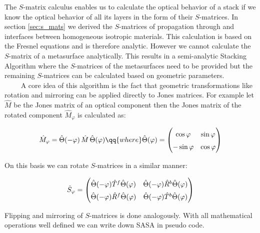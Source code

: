 The $S$-matrix calculus enables us to calculate the optical behavior of a stack if we know the optical behavior of all its layers in the form of their $S$-matrices. In section \ref{sec:s_mats} we derived the $S$-matrices of propagation through and interfaces between homogeneous isotropic materials. This calculation is based on the Fresnel equations and is therefore analytic. However we cannot calculate the $S$-matrix of a metasurface analytically. This results in a semi-analytic Stacking Algorithm where the $S$-matrices of the metasurfaces need to be provided but the remaining $S$-matrices can be calculated based on geometric parameters.
\\


$\qquad$ A core idea of this algorithm is the fact that geometric transformations like rotation and mirroring can be applied directly to Jones matrices. For example let $\hat M$ be the Jones matrix of an optical component then the Jones matrix of the rotated component $\hat{M}_{\varphi}$ is calculated as:

\begin{equation}
    \hat{M}_{\varphi} = \hat \Theta(-\varphi) \, \hat{M} \, \hat \Theta(\varphi)
    \qq{where}
    \hat \Theta(\varphi) =
    \begin{pmatrix}
        \cos \varphi & \sin \varphi \\
        -\sin \varphi & \cos \varphi
    \end{pmatrix}
\end{equation}

On this basis we can rotate $S$-matrices in a similar manner:

\begin{equation}
    \hat S_\varphi =
    \begingroup
    \renewcommand*{\arraystretch}{1.5}
        \begin{pmatrix}
            \hat \Theta(-\varphi) \hat T^f \hat \Theta(\varphi)&
            \hat \Theta(-\varphi) \hat R^b \hat \Theta(\varphi)\\
            \hat \Theta(-\varphi) \hat R^f \hat \Theta(\varphi)&
            \hat \Theta(-\varphi) \hat T^b \hat \Theta(\varphi)
        \end{pmatrix}
    \endgroup
\end{equation}

Flipping and mirroring of $S$-matrices is done analogously. With all mathematical operations well defined we can write down SASA in pseudo code.


